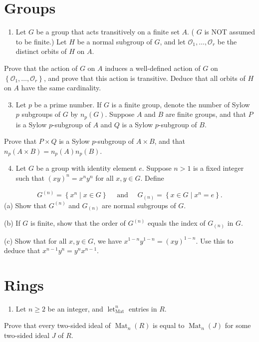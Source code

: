 \documentclass[10pt]{article}
\begin{document}
\section{Groups}
\begin{enumerate}
  \item Let $G$ be a group that acts transitively on a finite set $A$. ( $G$ is NOT assumed to be finite.) Let $H$ be a normal subgroup of $G$, and let $\mathcal{O}_{1}, \ldots, \mathcal{O}_{r}$ be the distinct orbits of $H$ on $A$.
\end{enumerate}
Prove that the action of $G$ on $A$ induces a well-defined action of $G$ on $\left\{\mathcal{O}_{1}, \ldots, \mathcal{O}_{r}\right\}$, and prove that this action is transitive. Deduce that all orbits of $H$ on $A$ have the same cardinality.

\begin{enumerate}
  \setcounter{enumi}{2}
  \item Let $p$ be a prime number. If $G$ is a finite group, denote the number of Sylow $p$ subgroups of $G$ by $n_{p}(G)$. Suppose $A$ and $B$ are finite groups, and that $P$ is a Sylow $p$-subgroup of $A$ and $Q$ is a Sylow $p$-subgroup of $B$.
\end{enumerate}
Prove that $P \times Q$ is a Sylow $p$-subgroup of $A \times B$, and that $n_{p}(A \times B)=n_{p}(A) n_{p}(B)$.

\begin{enumerate}
  \setcounter{enumi}{3}
  \item Let $G$ be a group with identity element $e$. Suppose $n>1$ is a fixed integer such that $(x y)^{n}=x^{n} y^{n}$ for all $x, y \in G$. Define
\end{enumerate}
$$
G^{(n)}=\left\{x^{n} \mid x \in G\right\} \quad \text { and } \quad G_{(n)}=\left\{x \in G \mid x^{n}=e\right\} .
$$
(a) Show that $G^{(n)}$ and $G_{(n)}$ are normal subgroups of $G$.

(b) If $G$ is finite, show that the order of $G^{(n)}$ equals the index of $G_{(n)}$ in $G$.

(c) Show that for all $x, y \in G$, we have $x^{1-n} y^{1-n}=(x y)^{1-n}$. Use this to deduce that $x^{n-1} y^{n}=y^{n} x^{n-1}$.

\section{Rings}
\begin{enumerate}
  \item Let $n \geq 2$ be an integer, and $\operatorname{let}_{\operatorname{Mat}}^{n}$ entries in $R$.
\end{enumerate}
Prove that every two-sided ideal of $\operatorname{Mat}_{n}(R)$ is equal to $\operatorname{Mat}_{n}(J)$ for some two-sided ideal $J$ of $R$.
\end{document}
